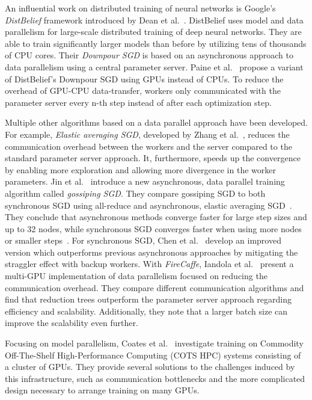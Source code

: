 \documentclass[conference]{IEEEtran}
\begin{document}
An influential work on distributed training of neural networks is Google’s \emph{DistBelief} framework introduced by Dean et al.~\cite{dean2012-Large-scale-distributed}.
DistBelief uses model and data parallelism for large-scale distributed training of deep neural networks.
They are able to train significantly larger models than before by utilizing tens of thousands of CPU cores.
Their \emph{Downpour SGD} is based on an asynchronous approach to data parallelism using a central parameter server.
%
Paine et al.~\cite{paine2013-GPU-async-SGD} propose a variant of DistBelief's Downpour SGD using GPUs instead of CPUs.
To reduce the overhead of GPU-CPU data-transfer, workers only communicated with the parameter server every n-th step instead of after each optimization step.

Multiple other algorithms based on a data parallel approach have been developed.
%
For example, \emph{Elastic averaging SGD}, developed by Zhang et al.~\cite{zhang2015-Elastic-AvgSGD}, reduces the communication overhead between the workers and the server compared to the standard parameter server approach.
It, furthermore, speeds up the convergence by enabling more exploration and allowing more divergence in the worker parameters.
%
Jin et al.~\cite{jin2016-How-to-scale} introduce a new asynchronous, data parallel training algorithm called \emph{gossiping SGD}.
They compare gossiping SGD to both synchronous SGD using all-reduce and asynchronous, elastic averaging SGD~\cite{zhang2015-Elastic-AvgSGD}.
They conclude that asynchronous methods converge faster for large step sizes and up to 32 nodes, while synchronous SGD converges faster when using more nodes or smaller steps~\cite{jin2016-How-to-scale}.
%
For synchronous SGD, Chen et al.~\cite{chen2016-Revisiting-distributed-synchronous-SGD} develop an improved version which outperforms previous asynchronous approaches by mitigating the straggler effect with backup workers.
%
With \emph{FireCaffe}, Iandola et al.~\cite{iandola2016-Firecaffe} present a multi-GPU implementation of data parallelism focused on reducing the communication overhead.
They compare different communication algorithms and find that reduction trees outperform the parameter server approach regarding efficiency and scalability.
Additionally, they note that a larger batch size can improve the scalability even further.

Focusing on model parallelism, Coates et al.~\cite{coates2013-DL-COTS-HPC} investigate training on Commodity Off-The-Shelf High-Performance Computing (COTS HPC) systems consisting of a cluster of GPUs.
They provide several solutions to the challenges induced by this infrastructure, such as communication bottlenecks and the more complicated design necessary to arrange training on many GPUs.
\end{document}
